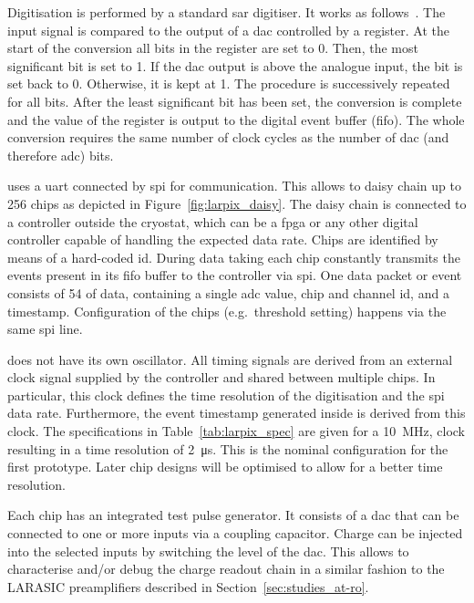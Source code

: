 Digitisation is performed by a standard \gls{sar} digitiser.
It works as follows~\cite{horowitzHill}.
The input signal is compared to the output of a \gls{dac} controlled by a register.
At the start of the conversion all bits in the register are set to \num{0}.
Then, the most significant bit is set to \num{1}.
If the \gls{dac} output is above the analogue input, the bit is set back to \num{0}.
Otherwise, it is kept at \num{1}.
The procedure is successively repeated for all bits.
After the least significant bit has been set, the conversion is complete and the value of the register is output to the digital event buffer (\gls{fifo}).
The whole conversion requires the same number of clock cycles as the number of \gls{dac} (and therefore \gls{adc}) bits.

\larpix{} uses a \gls{uart} connected by \gls{spi} for communication.
This allows to daisy chain up to \num{256} \larpix{} chips as depicted in Figure~\ref{fig:larpix_daisy}.
The daisy chain is connected to a \larpix{} controller outside the cryostat, which can be a \gls{fpga} or any other digital controller capable of handling the expected data rate.
Chips are identified by means of a hard-coded \gls{id}.
During data taking each \larpix{} chip constantly transmits the events present in its \gls{fifo} buffer to the controller via \gls{spi}.
One data packet or event consists of \SI{54}{\bit} of data, containing a single \gls{adc} value, chip and channel \gls{id}, and a timestamp.
Configuration of the \larpix{} chips (e.g.\ threshold setting) happens via the same \gls{spi} line.

\larpix{} does not have its own oscillator.
All timing signals are derived from an external clock signal supplied by the controller and shared between multiple chips.
In particular, this clock defines the time resolution of the digitisation and the \gls{spi} data rate.
Furthermore, the event timestamp generated inside \larpix{} is derived from this clock.
The specifications in Table~\ref{tab:larpix_spec} are given for a \SI{10}{\mega\hertz}, clock resulting in a time resolution of \SI{2}{\micro\second}.
This is the nominal configuration for the first prototype.
Later chip designs will be optimised to allow for a better time resolution.

Each \larpix{} chip has an integrated test pulse generator.
It consists of a \gls{dac} that can be connected to one or more inputs via a coupling capacitor.
Charge can be injected into the selected inputs by switching the level of the \gls{dac}.
This allows to characterise and/or debug the charge readout chain in a similar fashion to the LARASIC preamplifiers described in Section~\ref{sec:studies_at-ro}.

